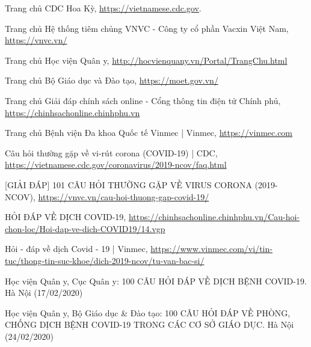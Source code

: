 \documentclass[runningheads]{llncs}
\begin{document}
\begin{thebibliography}{8}

Trang chủ CDC Hoa Kỳ, \url{https://vietnamese.cdc.gov}.

Trang chủ Hệ thống tiêm chủng VNVC - Công ty cổ phần Vacxin Việt Nam, \url{https://vnvc.vn/}

Trang chủ Học viện Quân y, \url{http://hocvienquany.vn/Portal/TrangChu.html}

Trang chủ Bộ Giáo dục và Đào tạo, \url{https://moet.gov.vn/}

Trang chủ Giải đáp chính sách online - Cổng thông tin điện tử Chính phủ,\\ \url{https://chinhsachonline.chinhphu.vn}

Trang chủ Bệnh viện Đa khoa Quốc tế Vinmec | Vinmec, \url{https://vinmec.com}

Câu hỏi thường gặp về vi-rút corona (COVID-19) | CDC, \url{https://vietnamese.cdc.gov/coronavirus/2019-ncov/faq.html}

[GIẢI ĐÁP] 101 CÂU HỎI THƯỜNG GẶP VỀ VIRUS CORONA (2019-NCOV), \url{https://vnvc.vn/cau-hoi-thuong-gap-covid-19/}

HỎI ĐÁP VỀ DỊCH COVID-19, \url{https://chinhsachonline.chinhphu.vn/Cau-hoi-chon-loc/Hoi-dap-ve-dich-COVID19/14.vgp}

Hỏi - đáp về dịch Covid - 19 | Vinmec, \url{https://www.vinmec.com/vi/tin-tuc/thong-tin-suc-khoe/dich-2019-ncov/tu-van-bac-si/}

Học viện Quân y, Cục Quân y: 100 CÂU HỎI ĐÁP VỀ DỊCH BỆNH COVID-19. Hà Nội (17/02/2020)

Học viện Quân y, Bộ Giáo dục \& Đào tạo: 100 CÂU HỎI ĐÁP VỀ PHÒNG, CHỐNG DỊCH BỆNH COVID-19 TRONG CÁC CƠ SỞ GIÁO DỤC. Hà Nội (24/02/2020)

\end{thebibliography}
\end{document}
